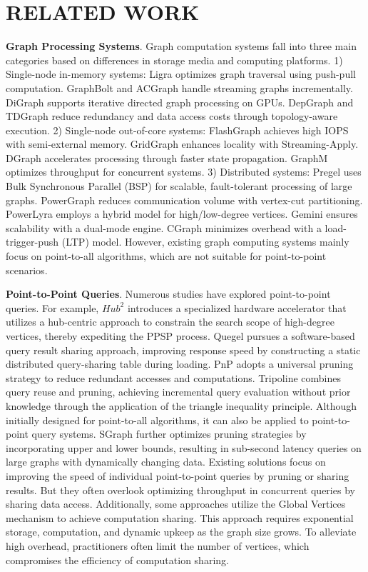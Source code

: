 \documentclass[10pt,journal,compsoc]{IEEEtran}
\begin{document}
\section{RELATED WORK}\label{relate_work}
{\bf{Graph Processing Systems}}. Graph computation systems fall into three main categories based on differences in storage media and computing platforms.
1) Single-node in-memory systems: Ligra \cite{ligra} optimizes graph traversal using push-pull computation. GraphBolt \cite{graphbolt} and ACGraph \cite{acgraph} handle streaming graphs incrementally. DiGraph \cite{digraph} supports iterative directed graph processing on GPUs. DepGraph \cite{depgraph} and TDGraph \cite{tdgraph} reduce redundancy and data access costs through topology-aware execution.
2) Single-node out-of-core systems: FlashGraph \cite{flashgraph} achieves high IOPS with semi-external memory. GridGraph \cite{gridgraph} enhances locality with Streaming-Apply. DGraph \cite{efficient} accelerates processing through faster state propagation. GraphM \cite{graphm} optimizes throughput for concurrent systems.
3) Distributed systems: Pregel \cite{pregel} uses Bulk Synchronous Parallel (BSP) for scalable, fault-tolerant processing of large graphs. PowerGraph \cite{powergraph} reduces communication volume with vertex-cut partitioning. PowerLyra \cite{powerlyra} employs a hybrid model for high/low-degree vertices. Gemini \cite{gemini} ensures scalability with a dual-mode engine. CGraph \cite{cgraph} minimizes overhead with a load-trigger-push (LTP) model.
However, existing graph computing systems mainly focus on point-to-all algorithms, which are not suitable for point-to-point scenarios.

{\bf{Point-to-Point Queries}}. Numerous studies have explored point-to-point queries. For example, $Hub^2$ \cite{hub} introduces a specialized hardware accelerator that utilizes a hub-centric approach to constrain the search scope of high-degree vertices, thereby expediting the PPSP process. Quegel \cite{quegel} pursues a software-based query result sharing approach, improving response speed by constructing a static distributed query-sharing table during loading. PnP \cite{pnp} adopts a universal pruning strategy to reduce redundant accesses and computations. Tripoline \cite{tripoline} combines query reuse and pruning, achieving incremental query evaluation without prior knowledge through the application of the triangle inequality principle. Although initially designed for point-to-all algorithms, it can also be applied to point-to-point query systems.
SGraph \cite{sgraph} further optimizes pruning strategies by incorporating upper and lower bounds, resulting in sub-second latency queries on large graphs with dynamically changing data.
Existing solutions focus on improving the speed of individual point-to-point queries by pruning or sharing results. But they often overlook optimizing throughput in concurrent queries by sharing data access. Additionally, some approaches utilize the Global Vertices mechanism to achieve computation sharing. This approach requires exponential storage, computation, and dynamic upkeep as the graph size grows. To alleviate high overhead, practitioners often limit the number of vertices, which compromises the efficiency of computation sharing.
\end{document}
